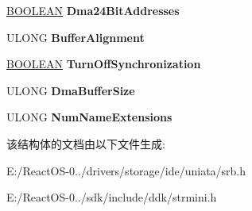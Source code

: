 \begin{DoxyCompactItemize}
\hyperlink{_processor_bind_8h_a112e3146cb38b6ee95e64d85842e380a}{B\+O\+O\+L\+E\+AN} {\bfseries Dma24\+Bit\+Addresses}
\item 
\mbox{\label{struct___h_w___i_n_i_t_i_a_l_i_z_a_t_i_o_n___d_a_t_a_af755a78a680c0aca5803d25ae6629580}} 
U\+L\+O\+NG {\bfseries Buffer\+Alignment}
\item 
\mbox{\label{struct___h_w___i_n_i_t_i_a_l_i_z_a_t_i_o_n___d_a_t_a_a72d9176d491eca7549ae00a926df3a0b}} 
\hyperlink{_processor_bind_8h_a112e3146cb38b6ee95e64d85842e380a}{B\+O\+O\+L\+E\+AN} {\bfseries Turn\+Off\+Synchronization}
\item 
\mbox{\label{struct___h_w___i_n_i_t_i_a_l_i_z_a_t_i_o_n___d_a_t_a_a0cb1fca6df62794f93e5375054897973}} 
U\+L\+O\+NG {\bfseries Dma\+Buffer\+Size}
\item 
\mbox{\label{struct___h_w___i_n_i_t_i_a_l_i_z_a_t_i_o_n___d_a_t_a_a284731f4df66908613caa25fd70487d3}} 
U\+L\+O\+NG {\bfseries Num\+Name\+Extensions}
\end{DoxyCompactItemize}


该结构体的文档由以下文件生成\+:\begin{DoxyCompactItemize}
\item 
E\+:/\+React\+O\+S-\/0../drivers/storage/ide/uniata/srb.\+h\item 
E\+:/\+React\+O\+S-\/0../sdk/include/ddk/strmini.\+h\end{DoxyCompactItemize}
